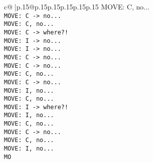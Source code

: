 \documentclass{article}
\begin{document}
{\begin{supertabular}{c@{$\;$}|p{.15\linewidth}@{}p{.15\linewidth}p{.15\linewidth}p{.15\linewidth}p{.15\linewidth}p{.15\linewidth}}
{{{ MOVE: C, no...\\ \tt  MOVE: C -> no...\\ \tt  MOVE: C, no...\\ \tt  MOVE: C -> where?!\\ \tt  MOVE: I -> no...\\ \tt  MOVE: I -> no...\\ \tt  MOVE: C -> no...\\ \tt  MOVE: C -> no...\\ \tt  MOVE: C, no...\\ \tt  MOVE: C -> no...\\ \tt  MOVE: I, no...\\ \tt  MOVE: C, no...\\ \tt  MOVE: I -> where?!\\ \tt  MOVE: I, no...\\ \tt  MOVE: C, no...\\ \tt  MOVE: C -> no...\\ \tt  MOVE: C, no...\\ \tt  MOVE: I, no...\\ \tt  MO}}}
\end{supertabular}}
\end{document}
